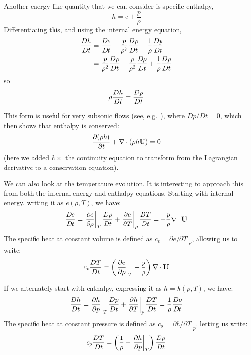 Another energy-like quantity that we can consider is specific enthalpy,
\begin{equation}
h = e + \frac{p}{\rho}
\end{equation}
Differentiating this, and using the internal energy equation,
\begin{align}
{\frac{{Dh}}{D t}} &= {\frac{{De}}{D t}} - \frac{p}{\rho^2} {\frac{{D\rho}}{D t}} + \frac{1}{\rho} {\frac{{Dp}}{D t}} \\
        &= \frac{p}{\rho^2}{\frac{{D\rho}}{D t}} - \frac{p}{\rho^2} {\frac{{D\rho}}{D t}} + \frac{1}{\rho} {\frac{{Dp}}{D t}}
\end{align}
so
\begin{equation}
\rho {\frac{{Dh}}{D t}} = {\frac{{Dp}}{D t}}
\end{equation}

This form is useful for very subsonic flows (see,
e.g.~\cite{SNpaper}), where $Dp/Dt = 0$, which then shows that
enthalpy is conserved:
\begin{equation}
{\frac{{\partial(\rho h)}}{\partial t}} + \nabla \cdot (\rho h {\bf U}) = 0
\end{equation}
(here we added $h \times$ the continuity equation to transform from
the Lagrangian derivative to a conservation equation).


We can also look at the temperature evolution.  It is interesting to
approach this from both the internal energy and enthalpy equations.
Starting with internal energy, writing it as $e(\rho, T)$, we have:
\begin{equation}
{\frac{{De}}{D t}} = \left . \frac{\partial e}{\partial \rho} \right |_T {\frac{{D\rho}}{D t}} +
          \left . \frac{\partial e}{\partial T} \right |_\rho {\frac{{DT}}{D t}} = -\frac{p}{\rho} \nabla \cdot {\bf U}
\end{equation}
The specific heat at constant volume is defined as $c_v = \partial
e/\partial T|_\rho$, allowing us to write:
\begin{equation}
c_v {\frac{{DT}}{D t}} = \left ( \left . \frac{\partial e}{\partial \rho} \right |_T - \frac{p}{\rho} \right ) \nabla \cdot {\bf U}
\end{equation}

If we alternately start with enthalpy, expressing it as $h = h(p, T)$,
we have:
\begin{equation}
{\frac{{Dh}}{D t}} = \left . \frac{\partial h}{\partial p} \right |_T {\frac{{Dp}}{D t}} +
          \left . \frac{\partial h}{\partial T} \right |_p {\frac{{DT}}{D t}} = \frac{1}{\rho} {\frac{{Dp}}{D t}}
\end{equation}
The specific heat at constant pressure is defined as $c_p = \partial
h/\partial T|_p$, letting us write:
\begin{equation}
c_p {\frac{{DT}}{D t}} = \left ( \frac{1}{\rho} - \left . \frac{\partial h}{\partial p} \right |_T \right ) {\frac{{Dp}}{D t}}
\end{equation}

